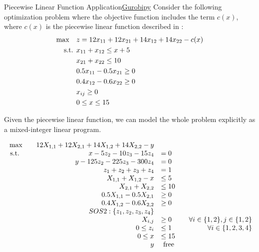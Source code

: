 \begin{examplewithcode}{Piecewise Linear Function Application}{\href{https://github.com/open-optimization/open-optimization-or-examples/blob/master/nonlinear-programming/Gurobi-SOS-Examples.ipynb}{Gurobipy}}
\label{example:pwl-application}
Consider the following optimization problem where the objective function includes the term $c(x)$, where $c(x)$ is the piecewise linear function described in :
\begin{align}
\max \quad & z = 12x_{11} + 12x_{21} + 14x_{12} + 14x_{22} - c(x) \\
\mbox{ s.t. }        & x_{11} + x_{12} \leq x + 5 \\
& x_{21} + x_{22} \leq 10 \\
& 0.5 x_{11} - 0.5x_{21} \geq 0 \\
& 0.4 x_{12} - 0.6 x_{22} \geq 0 \\
& x_{ij} \geq 0 \\
& 0 \leq x \leq 15
\end{align}

Given the piecewise linear function, we can model the whole problem explicitly as a mixed-integer linear program.

 \begin{equation}
 \begin{array}{rrlr}
 \max\quad & 12 X_{1,1} + 12 X_{2,1} + 14 X_{1,2} + 14 X_{2,2} - y\\
\mbox{ s.t. } \quad & x - 5 z_{2} - 10 z_{3} - 15 z_{4} &= 0\\
 & y - 125 z_{2} - 225 z_{3} - 300 z_{4} &= 0\\
 & z_{1} + z_{2} + z_{3} + z_{4} &= 1\\
 & X_{1,1} + X_{1,2} - x &\leq 5\\
 & X_{2,1} + X_{2,2} &\leq 10\\
 & 0.5 X_{1,1} - 0.5 X_{2,1} &\geq 0\\
 & 0.4 X_{1,2} - 0.6 X_{2,2} &\geq 0\\
 & SOS2: \{z_1, z_2, z_3, z_4\}\\
 & X_{i,j} &\geq 0 &\quad\forall i \in \{1,2\}, j \in \{1,2\}\\
 & 0 \leq z_{i} &\leq 1 &\quad\forall i \in \{1,2,3,4\}\\
 & 0 \leq x &\leq 15\\
 & y & \mbox{ free} \\
\end{array}
\end{equation}
\end{examplewithcode}


